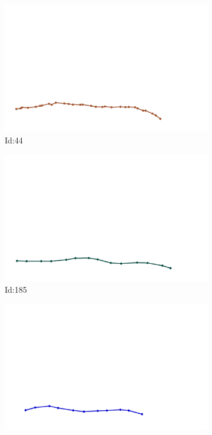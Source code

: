 \documentclass[12pt,twoside]{report}
\begin{document}
\begin{figure}
\centering
\begin{subfigure}[b]{0.20\textwidth}
\centering
\includegraphics[width=\textwidth]{../../trajectories/44.png}
\caption{Id:44}
\end{subfigure}
\begin{subfigure}[b]{0.20\textwidth}
\centering
\includegraphics[width=\textwidth]{../../trajectories/185.png}
\caption{Id:185}
\end{subfigure}
\begin{subfigure}[b]{0.20\textwidth}
\centering
\includegraphics[width=\textwidth]{../../trajectories/193.png}

\end{subfigure}
\end{figure}
\end{document}
